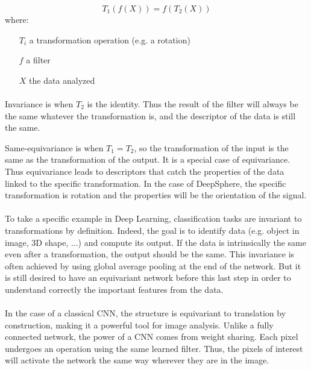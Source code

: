 \documentclass[11pt]{report}
\begin{document}
\begin{equation}
    T_1(f(X)) = f(T_2(X))
    \label{equ:equivariance}
\end{equation}
where:
\begin{itemize}
    \item[$T_i$] a transformation operation (e.g. a rotation)
    \item[$f$] a filter
    \item[$X$] the data analyzed
\end{itemize}
\paragraph*{}
Invariance is when $T_2$ is the identity. Thus the result of the filter will always be the same whatever the transformation is, and the descriptor of the data is still the same.

Same-equivariance is when $T_1 = T_2$, so the transformation of the input is the same as the transformation of the output. It is a special case of equivariance. Thus equivariance leads to descriptors that catch the properties of the data linked to the specific transformation. In the case of DeepSphere, the specific transformation is rotation and the properties will be the orientation of the signal.

\paragraph*{}
To take a specific example in Deep Learning, classification tasks are invariant to transformations by definition. Indeed, the goal is to identify data (e.g. object in image, 3D shape, ...) and compute its output. If the data is intrinsically the same even after a transformation, the output should be the same. This invariance is often achieved by using global average pooling at the end of the network. But it is still desired to have an equivariant network before this last step in order to understand correctly the important features from the data.
        
\paragraph*{}
In the case of a classical CNN, the structure is equivariant to translation by construction, making it a powerful tool for image analysis. Unlike a fully connected network, the power of a CNN comes from weight sharing. Each pixel undergoes an operation using the same learned filter. Thus, the pixels of interest will activate the network the same way wherever they are in the image.
        
\end{document}
